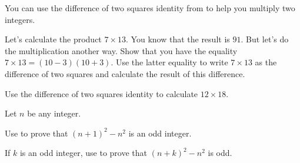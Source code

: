 \documentclass[a4paper,oneside,12pt]{article}
\begin{document}
\begin{problem}
\item You can use the difference of two squares identity from
   to help you multiply two
  integers.
  \begin{packedenum}
  \item\label{subprob:difference_two_squares_7_13}
    Let's calculate the product $7 \times 13$.  You know that the
    result is $91$.  But let's do the multiplication another way.
    Show that you have the equality $7 \times 13 = (10 - 3) (10 + 3)$.
    Use the latter equality to write $7 \times 13$ as the difference
    of two squares and calculate the result of this difference.

  \item\label{subprob:difference_two_squares_12_18}
    Use the difference of two squares identity to calculate
    $12 \times 18$.
  \end{packedenum}

\item Let $n$ be any integer.
  \begin{packedenum}
  \item\label{subprob:difference_two_consecutive_squares}
    Use  to prove that
    $(n + 1)^2 - n^2$ is an odd integer.

  \item\label{subprob:difference_two_integer_squares_odd}
    If $k$ is an odd integer, use
     to prove that
    $(n + k)^2 - n^2$ is odd.


\end{packedenum}
\end{problem}
\end{document}
